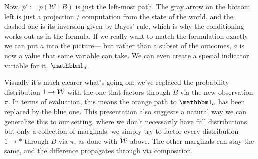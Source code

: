 \documentclass{article}
\begin{document}
	
	\begin{center}
	\end{center}

	Now, $p' := p(\mathcal W \mid B)$ is just the left-most path. The gray arrow on the bottom left is just a projection / computation from the state of the world, and the dashed one is its inversion given by Bayes' rule, which is why the conditioning works out as in the formula. If we really want to match the formulation exactly we can put $a$ into the picture--- but rather than a subset of the outcomes, $a$ is now a value that some variable can take. We can even create a special indicator variable for it, $\mathbbm 1_a$.
	
	
	\begin{center}
	\end{center}

	Visually it's much clearer what's going on: we've replaced the probability distribution $1 \to \cal W$ with the one that factors through $B$ via the new observation $\pi$. In terms of evaluation, this means the orange path to $\mathbbm 1_a$ has been replaced by the blue one.
	This presentation also suggests a natural way we can generalize this to our setting, where we don't necessarily have full distributions but only a collection of marginals: we simply try to factor every distribution $1 \to *$ through $B$ via $\pi$, as done with $\cal W$ above. The other marginals can stay the same, and the difference propagates through via composition.
	
\end{document}
